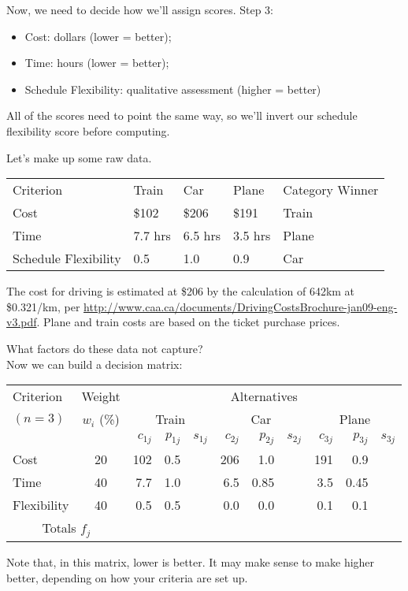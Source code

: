 Now, we need to decide how we'll assign scores. Step 3:
\begin{itemize}
\item Cost: dollars (lower = better);
\item Time: hours (lower = better);
\item Schedule Flexibility: qualitative assessment (higher = better)
\end{itemize}
All of the scores need to point the same way, so we'll invert our
schedule flexibility score before computing.

Let's make up some raw data.

\begin{center}
\begin{tabular}{lllll}
Criterion & Train & Car & Plane & Category Winner \\
Cost & \$102 & \$206 & \$191 & Train \\
Time & 7.7 hrs & 6.5 hrs & 3.5 hrs & Plane \\
Schedule Flexibility & 0.5 & 1.0 & 0.9 & Car
\end{tabular}
\end{center}

The cost for driving is estimated at \$206 by the calculation of 642km at \$0.321/km, per \url{http://www.caa.ca/documents/DrivingCostsBrochure-jan09-eng-v3.pdf}. Plane and train costs are based on the ticket purchase prices.

{\sf What factors do these data not capture?}\\[2em]

Now we can build a decision matrix:

{\Large
\begin{center}
\begin{tabular}{l|c|rrr|rrr|rrr}
Criterion & Weight & \multicolumn{9}{c}{Alternatives} \\
$(n=3)$ & $w_i$ (\%) & \multicolumn{3}{c|}{Train} & \multicolumn{3}{c|}{Car} & \multicolumn{3}{c}{Plane} \\
&& $c_{1j}$ & $p_{1j}$& $s_{1j}$ & $c_{2j}$ & $p_{2j}$ & $s_{2j}$ & $c_{3j}$ & $p_{3j}$ & $s_{3j}$ \\  \hline
Cost & 20 & 102 & 0.5 & & 206 & 1.0 & & 191 & 0.9 &  \\
Time & 40 & 7.7 & 1.0 & & 6.5 & 0.85 & & 3.5 & 0.45 \\
Flexibility & 40 & 0.5&0.5 &&0.0 &0.0 &&0.1 &0.1& \\ \hline
\multicolumn{2}{c|}{Totals $f_j$} & 
\end{tabular}
\end{center}
}
Note that, in this matrix, lower is better. It may make sense to make
higher better, depending on how your criteria are set up.

